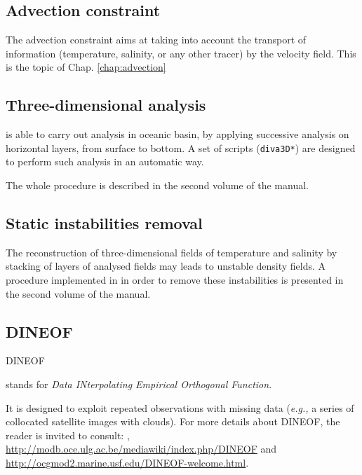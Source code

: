  
\subsection{Advection constraint}


The advection constraint aims at taking into account the transport of information (temperature, salinity, or any other tracer) by the velocity field. 
This is the topic of Chap. \ref{chap:advection}


\subsection{Three-dimensional analysis}

\diva is able to carry out analysis in oceanic basin, by applying successive analysis on horizontal layers, from surface to bottom. A set of scripts (\texttt{diva3D*}) are designed to perform such analysis in an automatic way.

The whole procedure is described in the second volume of the manual.

\subsection{Static instabilities removal}

The reconstruction of three-dimensional fields of temperature and salinity by stacking of layers of analysed fields may leads to unstable density fields. A procedure implemented in \diva in order to remove these instabilities is presented in the second volume of the manual.

\subsection{DINEOF\label{lasttool}}

\hypertarget{DINEOF}{DINEOF} stands for \textit{Data INterpolating Empirical Orthogonal Function}.

It is designed to exploit repeated observations with missing data (\textit{e.g.,} a series of collocated satellite images with clouds).
For more details about DINEOF, the reader is invited to consult:
\cite{ALVERA05,ALVERA07,BECKERS03,BECKERS06}, \url{http://modb.oce.ulg.ac.be/mediawiki/index.php/DINEOF} and   \url{http://ocgmod2.marine.usf.edu/DINEOF-welcome.html}.



